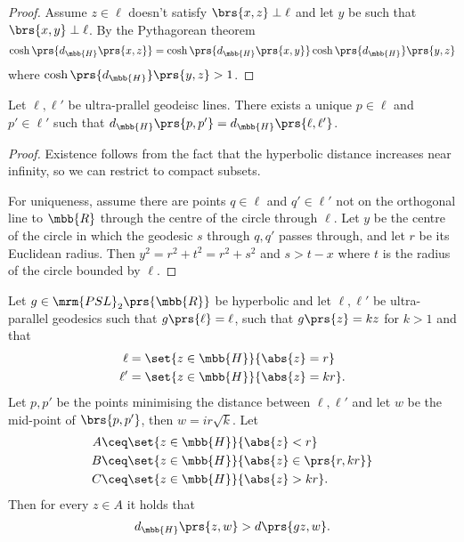 \documentclass[10pt, twoside]{book}
\begin{document}
\begin{proof}
Assume $z \in \ell$ doesn't satisfy $\brs{x,z} \perp \ell$ and let $y$ be such that $\brs{x,y} \perp \ell$.  By the Pythagorean theorem
\[\cosh\prs{d_{\mbb{H}}\prs{x,z}} = \cosh\prs{d_{\mbb{H}}\prs{x,y}} \cosh\prs{d_{\mbb{H}}}\prs{y,z}\]
where $\cosh\prs{d_{\mbb{H}}}\prs{y,z} > 1$.
\end{proof}

\begin{proposition}
Let $\ell, \ell'$ be ultra-prallel geodeisc lines. There exists a unique $p \in \ell$ and $p' \in \ell'$ such that  $d_{\mbb{H}}\prs{p,p'} = d_{\mbb{H}}\prs{\ell, \ell'}$.
\end{proposition}

\begin{proof}
Existence follows from the fact that the hyperbolic distance increases near infinity, so we can restrict to compact subsets.

For uniqueness, assume there are points $q \in \ell$ and $q' \in \ell'$ not on the orthogonal line to $\mbb{R}$ through the centre of the circle through $\ell$.
Let $y$ be the centre of the circle in which the geodesic $s$ through $q,q'$ passes through, and let $r$ be its Euclidean radius. Then $y^2 = r^2 + t^2 = r^2 + s^2$ and $s > t - x$ where $t$ is the radius of the circle bounded by $\ell$.
\end{proof}

\begin{proposition}
Let $g \in \mrm{PSL}_2\prs{\mbb{R}}$ be hyperbolic and let $\ell,\ell'$ be ultra-parallel geodesics such that $g\prs{\ell} = \ell$, such that $g\prs{z} = kz$ for $k > 1$ and that
\begin{align*}
\ell &= \set{z \in \mbb{H}}{\abs{z} = r} \\
\ell' &= \set{z \in \mbb{H}}{\abs{z} = kr} \text{.}
\end{align*}
Let $p,p'$ be the points minimising the distance between $\ell,\ell'$ and let $w$ be the mid-point of $\brs{p,p'}$, then $w = ir \sqrt{k}$.
Let
\begin{align*}
A &\ceq \set{z \in \mbb{H}}{\abs{z} < r} \\
B &\ceq \set{z \in \mbb{H}}{\abs{z} \in \prs{r, kr}} \\
C &\ceq \set{z \in \mbb{H}}{\abs{z} > kr} \text{.}
\end{align*}
Then for every $z \in A$ it holds that
\[d_{\mbb{H}}\prs{z,w} > d\prs{gz, w} \text{.}\]
\end{proposition}
\end{document}
